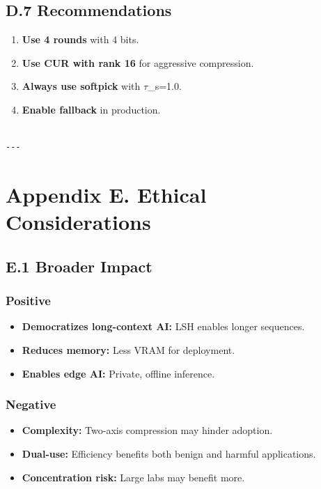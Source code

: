 \subsection{D.7 Recommendations}

\begin{enumerate}
\item \textbf{Use 4 rounds} with 4 bits.
\item \textbf{Use CUR with rank 16} for aggressive compression.
\item \textbf{Always use softpick} with $\tau$\_s=1.0.
\item \textbf{Enable fallback} in production.
\end{enumerate}
\begin{lstlisting}

---
\end{lstlisting}


\section{Appendix E. Ethical Considerations}

\subsection{E.1 Broader Impact}

\subsubsection{Positive}
\begin{itemize}
\item \textbf{Democratizes long-context AI:} LSH enables longer sequences.
\item \textbf{Reduces memory:} Less VRAM for deployment.
\item \textbf{Enables edge AI:} Private, offline inference.

\end{itemize}
\subsubsection{Negative}
\begin{itemize}
\item \textbf{Complexity:} Two-axis compression may hinder adoption.
\item \textbf{Dual-use:} Efficiency benefits both benign and harmful applications.
\item \textbf{Concentration risk:} Large labs may benefit more.

\end{itemize}
